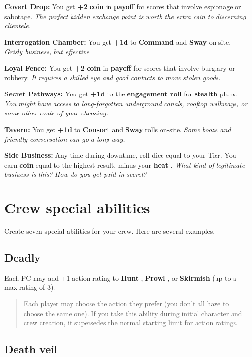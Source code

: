 \documentclass[11pt,oneside]{book}
\newcommand{\gameterm}[1]{\textbf{#1}}
\begin{document}
\gameterm{Covert Drop:}  You get \textbf{+2} \gameterm{coin}  in \textbf{payoff} for scores that involve espionage or sabotage. \emph{The perfect hidden exchange point is worth the extra coin to discerning clientele.}

\gameterm{Interrogation Chamber:}  You get \textbf{+1d} to \gameterm{Command}  and \gameterm{Sway}  on-site. \emph{Grisly business, but effective.}

\gameterm{Loyal Fence:}  You get \textbf{+2} \gameterm{coin}  in \textbf{payoff} for scores that involve burglary or robbery. \emph{It requires a skilled eye and good contacts to move stolen goods.}

\gameterm{Secret Pathways: }  You get \textbf{+1d} to the \textbf{engagement roll} for \textbf{stealth} plans. \emph{You might have access to long-forgotten underground canals, rooftop walkways, or some other route of your choosing.}

\gameterm{Tavern:}  You get \textbf{+1d} to \gameterm{Consort}  and \gameterm{Sway}  rolls on-site. \emph{Some booze and friendly conversation can go a long way.}

\gameterm{Side Business:}  Any time during downtime, roll dice equal to your Tier. You earn \gameterm{coin}  equal to the highest result, minus your \gameterm{heat} . \emph{What kind of legitimate business is this? How do you get paid in secret?}

\section{Crew special abilities}

Create seven special abilities for your crew. Here are several examples.

\subsection{Deadly}

Each PC may add +1 action rating to \gameterm{Hunt} , \gameterm{Prowl} , or \gameterm{Skirmish}  (up to a max rating of 3).

\begin{quote}
	Each player may choose the action they prefer (you don’t all have to choose the same one). If you take this ability during initial character and crew creation, it supersedes the normal starting limit for action ratings.
\end{quote} 

\subsection{Death veil}
\end{document}
